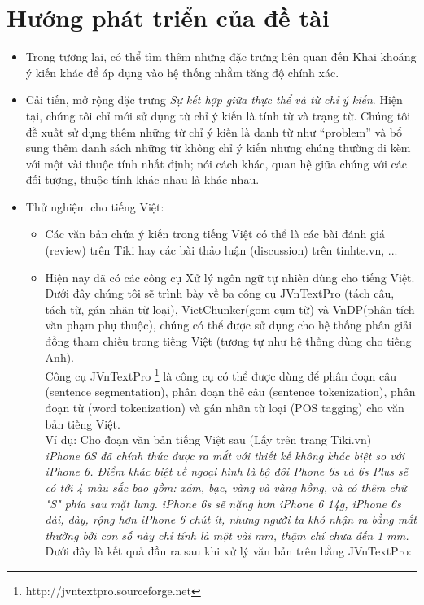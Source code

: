 \documentclass[12pt]{report}
\begin{document}
		\section*{Hướng phát triển của đề tài}		
		\begin{itemize}
			\item{Trong tương lai, có thể tìm thêm những đặc trưng liên quan đến Khai khoáng ý kiến khác để áp dụng vào hệ thống nhằm tăng độ chính xác.}
			\item{Cải tiến, mở rộng đặc trưng \textit{Sự kết hợp giữa thực thể và từ chỉ ý kiến}. Hiện tại, chúng tôi chỉ mới sử dụng từ chỉ ý kiến là tính từ và trạng từ. Chúng tôi đề xuất sử dụng thêm những từ chỉ ý kiến là danh từ như “problem” và bổ sung thêm danh sách những từ không chỉ ý kiến nhưng chúng thường đi kèm với một vài thuộc tính nhất định; nói cách khác, quan hệ giữa chúng với các đối tượng, thuộc tính khác nhau là khác nhau.}
			\item{Thử nghiệm cho tiếng Việt:
				\begin{itemize}
					\item{Các văn bản chứa ý kiến trong tiếng Việt có thể là các bài đánh giá (review) trên Tiki hay các bài thảo luận (discussion) trên tinhte.vn, ...
					}
					\item{Hiện nay đã có các công cụ Xử lý ngôn ngữ tự nhiên dùng cho tiếng Việt. Dưới đây chúng tôi sẽ trình bày về ba công cụ JVnTextPro (tách câu, tách từ, gán nhãn từ loại), VietChunker(gom cụm từ) và VnDP(phân tích văn phạm phụ thuộc), chúng có thể được sử dụng cho hệ thống phân giải đồng tham chiếu trong tiếng Việt (tương tự như hệ thống dùng cho tiếng Anh).					
					\\Công cụ JVnTextPro \footnote{http://jvntextpro.sourceforge.net} là công cụ có thể được dùng để phân đoạn câu (sentence segmentation), phân đoạn thẻ câu (sentence tokenization), phân đoạn từ (word tokenization) và gán nhãn từ loại (POS tagging) cho văn bản tiếng Việt.
					\\Ví dụ: Cho đoạn văn bản tiếng Việt sau (Lấy trên trang Tiki.vn)
					\\\textit{iPhone 6S đã chính thức được ra mắt với thiết kế không khác biệt so với iPhone 6. Điểm khác biệt về ngoại hình là bộ đôi Phone 6s và 6s Plus sẽ có tới 4 màu sắc bao gồm: xám, bạc, vàng và vàng hồng, và có thêm chữ "S" phía sau mặt lưng. iPhone 6s sẽ nặng hơn iPhone 6 14g, iPhone 6s dài, dày, rộng hơn iPhone 6 chút ít, nhưng người ta khó nhận ra bằng mắt thường bởi con số này chỉ tính là một vài mm, thậm chí chưa đến 1 mm.}
					\\Dưới đây là kết quả đầu ra sau khi xử lý văn bản trên bằng JVnTextPro:
}
\end{itemize}}
\end{itemize}
\end{document}
